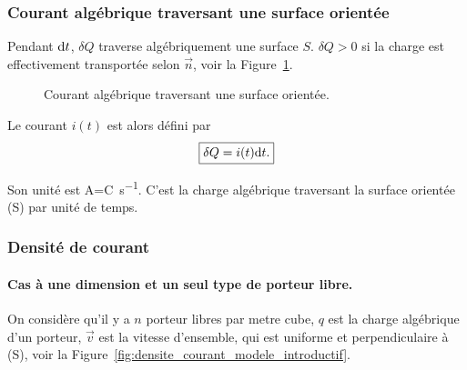         \subsubsection{Courant algébrique traversant une surface orientée}

            Pendant $\mathrm{d} t$, $\delta Q$ traverse algébriquement une surface $S$. $\delta Q>0$ si la charge est effectivement transportée selon $\vec{n}$, voir la Figure~\ref{fig:courant_algebrique_traversant_surface_orientee}.

            \begin{figure}
                \centering
                \caption{Courant algébrique traversant une surface orientée.}    
                \label{fig:courant_algebrique_traversant_surface_orientee}
            \end{figure}

            Le courant $i(t)$ est alors défini par 
            \begin{equation}
                \boxed{
                    \delta Q=i(t)\mathrm{d} t.
                }
            \end{equation}

            Son unité est \si{\ampere}=\si{\coulomb\per\second}. C'est la charge algébrique traversant la surface orientée (S) par unité de temps.

        \subsubsection{Densité de courant}

            \paragraph{Cas à une dimension et un seul type de porteur libre.}

                On considère qu'il y a $n$ porteur libres par metre cube, $q$ est la charge algébrique d'un porteur, $\vec{v}$ est la vitesse d'ensemble, qui est uniforme et perpendiculaire à (S), voir la Figure~\ref{fig:densite_courant_modele_introductif}.


